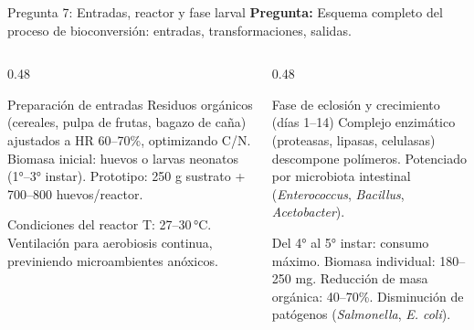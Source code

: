 \documentclass[aspectratio=169, 11pt]{beamer}
\begin{document}
\begin{frame}{Pregunta 7: Entradas, reactor y fase larval}
\textbf{Pregunta:} Esquema completo del proceso de bioconversión: entradas, transformaciones, salidas.

\vspace{0.3cm}
\begin{columns}[T]
\begin{column}{0.48\textwidth}
\begin{block}{Preparación de entradas}
\footnotesize
Residuos orgánicos (cereales, pulpa de frutas, bagazo de caña) ajustados a HR 60--70\%, optimizando C/N. Biomasa inicial: huevos o larvas neonatos (1°--3° instar). Prototipo: 250 g sustrato + 700--800 huevos/reactor.
\end{block}
\begin{block}{Condiciones del reactor}
\footnotesize
T: 27--30\,°C. Ventilación para aerobiosis continua, previniendo microambientes anóxicos.
\end{block}
\end{column}
\begin{column}{0.48\textwidth}
\begin{exampleblock}{Fase de eclosión y crecimiento (días 1--14)}
\footnotesize
Complejo enzimático (proteasas, lipasas, celulasas) descompone polímeros. Potenciado por microbiota intestinal (\textit{Enterococcus}, \textit{Bacillus}, \textit{Acetobacter}).

Del 4° al 5° instar: consumo máximo. Biomasa individual: 180--250 mg. Reducción de masa orgánica: 40--70\%. Disminución de patógenos (\textit{Salmonella}, \textit{E. coli}).
\end{exampleblock}
\end{column}
\end{columns}
\end{frame}
\end{document}
